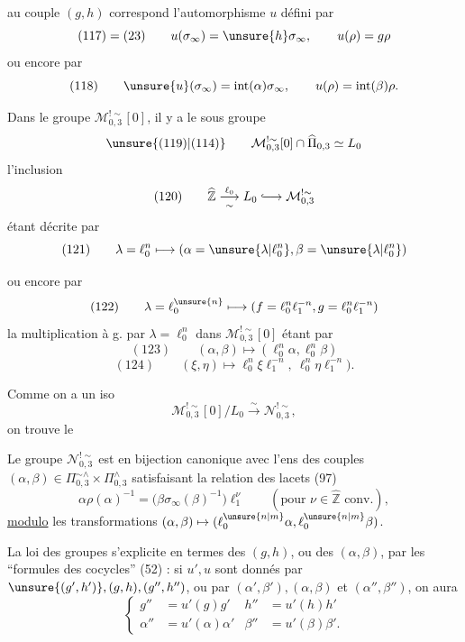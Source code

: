 
au couple 
$(g,h)$ correspond l'automorphisme $u$ défini par
\[
 (117)=(23)\qquad
 u(\sigma_\infty)=\unsure{h}\sigma_\infty,\qquad
 u(\rho)=g\rho
\]
ou encore par
\[
 (118)\qquad
 \unsure{u}(\sigma_\infty)=\mathrm{int}(\alpha)\sigma_\infty,\qquad
 u(\rho)=\mathrm{int}(\beta)\rho.
\]

Dans le groupe $\mathcal M_{0,3}^{!\sim}[0]$, il y a le sous groupe
\[
 \unsure{(119)|(114)}\qquad
 \mathcal M_{0,3}^{!\sim}[0]\cap\widehat{\Pi}_{0,3}\simeq L_0
\]
l'inclusion
\[
 (120)\qquad
 \widehat{\mathbb Z}\overset{\ell_0}{\underset{\sim}{\longrightarrow}}
 L_0\lhook\joinrel\longrightarrow\mathcal M_{0,3}^{!\sim}
\]
étant décrite par
\[
 (121)\qquad
 \lambda=\ell_0^n\longmapsto
 (\alpha=\unsure{\lambda|\ell_0^n},
 \beta=\unsure{\lambda|\ell_0^n})
\]

ou encore par
\[
 (122)\qquad
 \lambda=\ell_0^{\unsure{n}}\longmapsto
 (f=\ell_0^n\ell_1^{-n},g=\ell_0^n\ell_1^{-n})
\]
la multiplication  à g. par 
$\lambda=\ell_0^n$ dans $\mathcal M_{0,3}^{!\sim}[0]$
étant  par
\[
 (123)\qquad
 (\alpha,\beta)\longmapsto(\ell_0^n\alpha,\ell_0^n\beta)
\]
\[
 (124)\qquad
 (\xi,\eta)\longmapsto
 \ell_0^n\xi\ell_1^{-n},\ \ell_0^n\eta\ell_1^{-n}).
\]


Comme on a un iso
\[
\mathcal M_{0,3}^{!\sim}[0]/L_0
\xrightarrow{\sim}\mathcal N_{0,3}^{!\sim},
\]
on trouve le

\uline{} Le groupe $\mathcal N_{0,3}^{!\sim}$ est en bijection
canonique avec l'ens des couples
$(\alpha,\beta)\in\Pi_{0,3}^{\sim\wedge}\times\Pi_{0,3}^{\wedge}$
satisfaisant la relation des lacets (97)
\[
\alpha\rho(\alpha)^{-1}
=\bigl(\beta\sigma_\infty(\beta)^{-1}\bigr)\ell_1^\nu
\qquad(\text{pour }\nu\in\widehat{\mathbb Z}\text{ conv.}),
\]
\uline{modulo} les transformations
$(\alpha,\beta)\mapsto(\ell_0^{\unsure{n|m}}\alpha,\ell_0^{\unsure{n|m}}\beta)$.

La loi des groupes  s'explicite en termes des $(g,h)$, ou des
$(\alpha,\beta)$, par les ``formules des cocycles'' (52) : si $u',u$
 sont donnés par
$\unsure{(g',h')},(g,h),(g'',h'')$, ou par
$(\alpha',\beta'),(\alpha,\beta)$ et $(\alpha'',\beta'')$, on aura
\[
\tag{125}
\left\{
\begin{aligned}
g''&=u'(g)g'&h''&=u'(h)h'\\
\alpha''&=u'(\alpha)\alpha'&\beta''&=u'(\beta)\beta'.
\end{aligned}
\right.
\]

